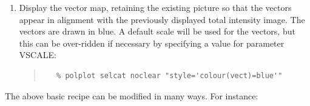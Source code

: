 \documentclass[twoside,11pt]{article}
\newcommand{\htmlref}[2]{#1}
\renewcommand{\_}{\texttt{\symbol{95}}}
\newenvironment{myquote}{\begin{quote}\begin{small}}{\end{small}\end{quote}}
\begin{document}
\begin{enumerate}
\item \label{STEP:POLPLOT} Display the vector map, retaining the existing picture so that the
vectors appear in alignment with the previously displayed total intensity
image. The vectors are drawn in blue. A default scale will be used for the 
vectors, but this can be over-ridden if necessary by specifying a value for
parameter \htmlref{VSCALE}{POLPLOT}:
\begin{myquote}
\begin{verbatim}
   % polplot selcat noclear "style='colour(vect)=blue'"
\end{verbatim}
\end{myquote}

\end{enumerate}

The above basic recipe can be modified in many ways. For instance:
\end{document}
